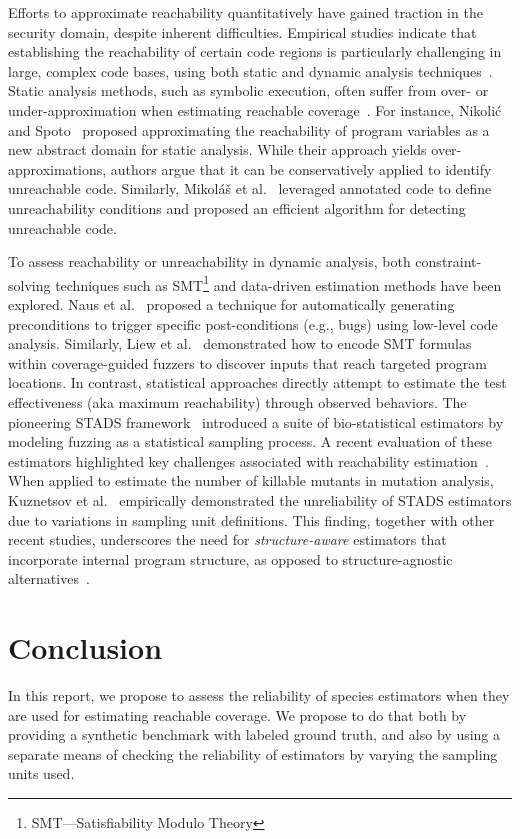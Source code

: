 \documentclass[conference]{IEEEtran}
\begin{document}
Efforts to approximate reachability quantitatively have gained traction in the security domain, despite inherent difficulties. Empirical studies indicate that establishing the reachability of certain code regions is particularly challenging in large, complex code bases, using both static and dynamic analysis techniques~\cite{latoza2010developers}. Static analysis methods, such as symbolic execution, often suffer from over- or under-approximation when estimating reachable coverage~\cite{liyanage2023reachable,aniche2015why}. For instance, Nikoli\'{c} and Spoto~\cite{nikolic2013reachability} proposed approximating the reachability of program variables as a new abstract domain for static analysis. While their approach yields over-approximations, authors argue that it can be conservatively applied to identify unreachable code. Similarly, Mikol\'{a}\v{s} et al.~\cite{janota2007reachability} leveraged annotated code to define unreachability conditions and proposed an efficient algorithm for detecting unreachable code.

To assess reachability or unreachability in dynamic analysis, both constraint-solving techniques such as SMT\footnote{SMT—Satisfiability Modulo Theory} and data-driven estimation methods have been explored. Naus et al.~\cite{naus2023low} proposed a technique for automatically generating preconditions to trigger specific post-conditions (e.g., bugs) using low-level code analysis. Similarly, Liew et al.~\cite{liew2019just} demonstrated how to encode SMT formulas within coverage-guided fuzzers to discover inputs that reach targeted program locations. In contrast, statistical approaches directly attempt to estimate the test effectiveness (aka maximum reachability) through observed behaviors. The pioneering STADS framework~\cite{boehme2018stads} introduced a suite of bio-statistical estimators by modeling fuzzing as a statistical sampling process. A recent evaluation of these estimators highlighted key challenges associated with reachability estimation~\cite{liyanage2023reachable}. When applied to estimate the number of killable mutants in mutation analysis, Kuznetsov et al.~\cite{Kuznetsov2024empirical} empirically demonstrated the unreliability of STADS estimators due to variations in sampling unit definitions. This finding, together with other recent studies, underscores the need for \emph{structure-aware} estimators that incorporate internal program structure, as opposed to structure-agnostic alternatives~\cite{lee2023statistical}.


\section{Conclusion}
\label{sec:conclusion}
In this report, we propose to assess the reliability of species estimators when
they are used for estimating reachable coverage. We propose to do that both by
providing a synthetic benchmark with labeled ground truth, and also by
using a separate means of checking the reliability of estimators by varying
the sampling units used.
\end{document}
